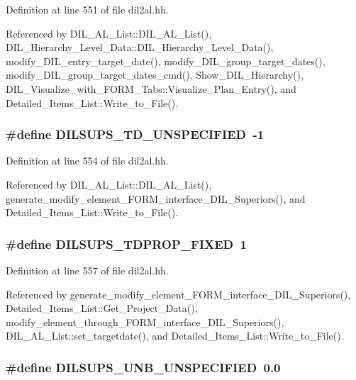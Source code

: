 Definition at line 551 of file dil2al.hh.

Referenced by DIL\_\-AL\_\-List::DIL\_\-AL\_\-List(), DIL\_\-Hierarchy\_\-Level\_\-Data::DIL\_\-Hierarchy\_\-Level\_\-Data(), modify\_\-DIL\_\-entry\_\-target\_\-date(), modify\_\-DIL\_\-group\_\-target\_\-dates(), modify\_\-DIL\_\-group\_\-target\_\-dates\_\-cmd(), Show\_\-DIL\_\-Hierarchy(), DIL\_\-Visualize\_\-with\_\-FORM\_\-Tabs::Visualize\_\-Plan\_\-Entry(), and Detailed\_\-Items\_\-List::Write\_\-to\_\-File().
\subsubsection{\setlength{\rightskip}{0pt plus 5cm}\#define DILSUPS\_\-TD\_\-UNSPECIFIED\ -1}\label{dil2al_8hh_a26}




Definition at line 554 of file dil2al.hh.

Referenced by DIL\_\-AL\_\-List::DIL\_\-AL\_\-List(), generate\_\-modify\_\-element\_\-FORM\_\-interface\_\-DIL\_\-Superiors(), and Detailed\_\-Items\_\-List::Write\_\-to\_\-File().
\subsubsection{\setlength{\rightskip}{0pt plus 5cm}\#define DILSUPS\_\-TDPROP\_\-FIXED\ 1}\label{dil2al_8hh_a29}




Definition at line 557 of file dil2al.hh.

Referenced by generate\_\-modify\_\-element\_\-FORM\_\-interface\_\-DIL\_\-Superiors(), Detailed\_\-Items\_\-List::Get\_\-Project\_\-Data(), modify\_\-element\_\-through\_\-FORM\_\-interface\_\-DIL\_\-Superiors(), DIL\_\-AL\_\-List::set\_\-targetdate(), and Detailed\_\-Items\_\-List::Write\_\-to\_\-File().
\subsubsection{\setlength{\rightskip}{0pt plus 5cm}\#define DILSUPS\_\-UNB\_\-UNSPECIFIED\ 0.0}\label{dil2al_8hh_a24}




